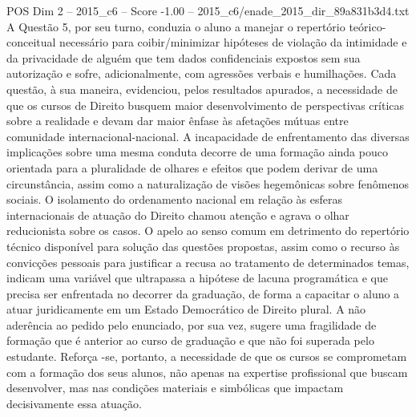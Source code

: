 \begin{textsample}{POS Dim 2 – 2015\_c6 – Score -1.00 – 2015\_c6/enade\_2015\_dir\_89a831b3d4.txt}
A Questão 5, por seu turno, conduzia o aluno a manejar o repertório teórico-conceitual necessário para coibir/minimizar hipóteses de violação da intimidade e da privacidade de alguém que tem dados confidenciais expostos sem sua autorização e sofre, adicionalmente, com agressões verbais e humilhações.
Cada questão, à sua maneira, evidenciou, pelos resultados apurados, a necessidade de que os cursos de Direito busquem maior desenvolvimento de perspectivas críticas sobre a realidade e devam dar maior ênfase às afetações mútuas entre comunidade internacional-nacional.
A incapacidade de enfrentamento das diversas implicações sobre uma mesma conduta decorre de uma formação ainda pouco orientada para a pluralidade de olhares e efeitos que podem derivar de uma circunstância, assim como a naturalização de visões hegemônicas sobre fenômenos sociais.
O isolamento do ordenamento nacional em relação às esferas internacionais de atuação do Direito chamou atenção e agrava o olhar reducionista sobre os casos.
O apelo ao senso comum em detrimento do repertório técnico disponível para solução das questões propostas, assim como o recurso às convicções pessoais para justificar a recusa ao tratamento de determinados temas, indicam uma variável que ultrapassa a hipótese de lacuna programática e que precisa ser enfrentada no decorrer da graduação, de forma a capacitar o aluno a atuar juridicamente em um Estado Democrático de Direito plural.
A não aderência ao pedido pelo enunciado, por sua vez, sugere uma fragilidade de formação que é anterior ao curso de graduação e que não foi superada pelo estudante.
Reforça -se, portanto, a necessidade de que os cursos se comprometam com a formação dos seus alunos, não apenas na expertise profissional que buscam desenvolver, mas nas condições materiais e simbólicas que impactam decisivamente essa atuação.

\end{textsample}

